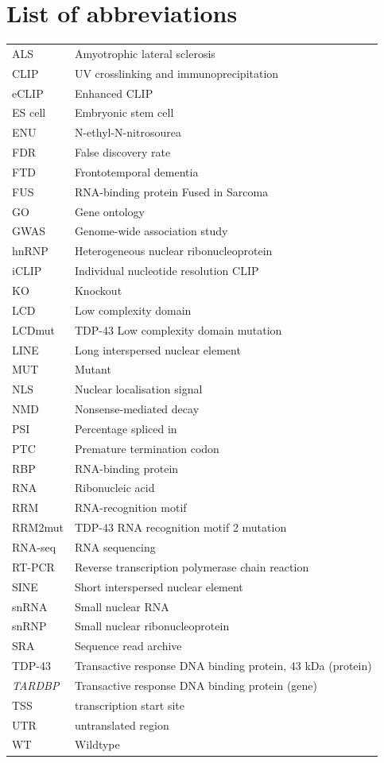 \section*{\LARGE{List of abbreviations}}
\begin{table}[h!]
	\begin{tabular}{ll}
		ALS & Amyotrophic lateral sclerosis \\
		CLIP & UV crosslinking and immunoprecipitation \\
		eCLIP & Enhanced CLIP \\
		ES cell & Embryonic stem cell \\
		ENU & N-ethyl-N-nitrosourea \\
		FDR & False discovery rate \\
		FTD	& Frontotemporal dementia \\
		FUS & RNA-binding protein Fused in Sarcoma \\
		GO & Gene ontology \\
		GWAS & Genome-wide association study \\
		hnRNP &	Heterogeneous nuclear ribonucleoprotein \\
		iCLIP & Individual nucleotide resolution CLIP \\
		KO & Knockout \\
		LCD & Low complexity domain \\
		LCDmut & TDP-43 Low complexity domain mutation\\
		LINE & Long interspersed nuclear element \\
		MUT & Mutant \\ 
		NLS & Nuclear localisation signal \\
		NMD & Nonsense-mediated decay \\
		PSI & Percentage spliced in \\
		PTC	& Premature termination codon \\
		RBP & RNA-binding protein \\
		RNA & Ribonucleic acid \\
		RRM & RNA-recognition motif \\
		RRM2mut & TDP-43 RNA recognition motif 2 mutation \\
		RNA-seq & RNA sequencing \\
		RT-PCR & Reverse transcription polymerase chain reaction \\ 
		SINE & Short interspersed nuclear element \\
		snRNA & Small nuclear RNA \\
		snRNP & Small nuclear ribonucleoprotein \\
		SRA & Sequence read archive \\
		TDP-43 & Transactive response DNA binding protein, 43 kDa (protein) \\
		\textit{TARDBP} & Transactive response DNA binding protein (gene) \\
		TSS & transcription start site \\
		UTR & untranslated region \\
		WT & Wildtype \\
	\end{tabular}
\end{table}
\hspace{0pt}
\vfill

